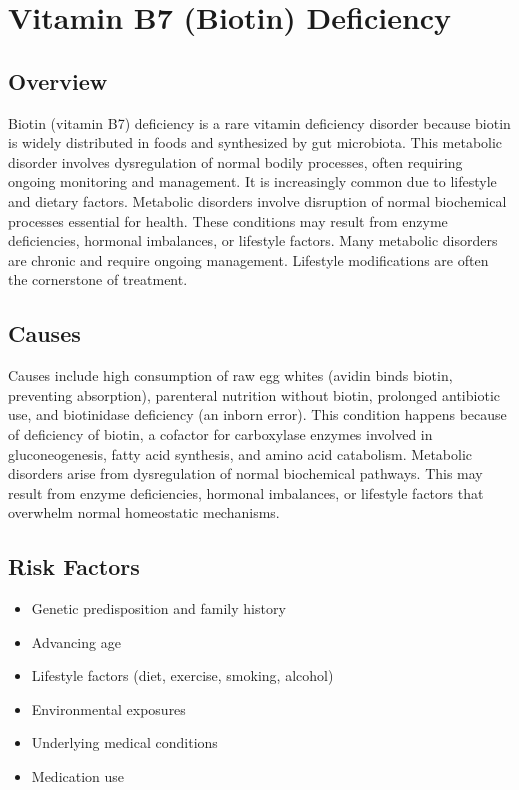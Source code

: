\chapter{Vitamin B7 (Biotin) Deficiency}
\label{sec:Vitamin B7 Deficiency}

\section{Overview}
Biotin (vitamin B7) deficiency is a rare vitamin deficiency disorder because biotin is widely distributed in foods and synthesized by gut microbiota. This metabolic disorder involves dysregulation of normal bodily processes, often requiring ongoing monitoring and management. It is increasingly common due to lifestyle and dietary factors. Metabolic disorders involve disruption of normal biochemical processes essential for health. These conditions may result from enzyme deficiencies, hormonal imbalances, or lifestyle factors. Many metabolic disorders are chronic and require ongoing management. Lifestyle modifications are often the cornerstone of treatment.
\section{Causes}
Causes include high consumption of raw egg whites (avidin binds biotin, preventing absorption), parenteral nutrition without biotin, prolonged antibiotic use, and biotinidase deficiency (an inborn error). This condition happens because of deficiency of biotin, a cofactor for carboxylase enzymes involved in gluconeogenesis, fatty acid synthesis, and amino acid catabolism. Metabolic disorders arise from dysregulation of normal biochemical pathways. This may result from enzyme deficiencies, hormonal imbalances, or lifestyle factors that overwhelm normal homeostatic mechanisms.   
\section{Risk Factors}
\begin{itemize}[noitemsep]
  \item Genetic predisposition and family history
  \item Advancing age
  \item Lifestyle factors (diet, exercise, smoking, alcohol)
  \item Environmental exposures
  \item Underlying medical conditions
  \item Medication use
\end{itemize}
